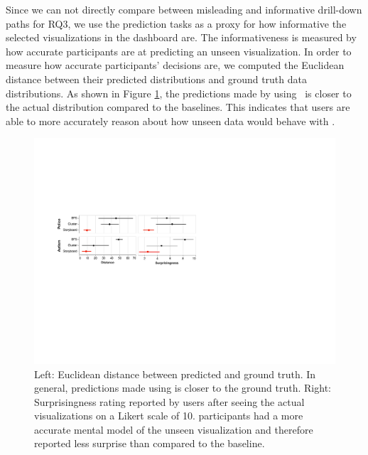  Since we can not directly compare between misleading and informative drill-down paths for RQ3, we use the prediction tasks as a proxy for how informative the selected visualizations in the dashboard are. The informativeness is measured by how accurate participants are at predicting an unseen visualization. In order to measure how accurate participants' decisions are, we computed the Euclidean distance between their predicted distributions and ground truth data distributions. As shown in Figure \ref{fig:distance}, the predictions made by using \system\ is closer to the actual distribution compared to the baselines. This indicates that users are able to more accurately reason about how unseen data would behave with \system. 
\begin{figure}[h!]
\centering
\includegraphics[width=\linewidth]{figures/prediction_surprisingness_distance.pdf}
\caption{Left: Euclidean distance between predicted and ground truth. In general, predictions made using \system is closer to the ground truth. Right: Surprisingness rating reported by users after seeing the actual visualizations on a Likert scale of 10. \system participants had a more accurate mental model of the unseen visualization and therefore reported less surprise than compared to the baseline.}
\label{fig:distance}
\end{figure}
